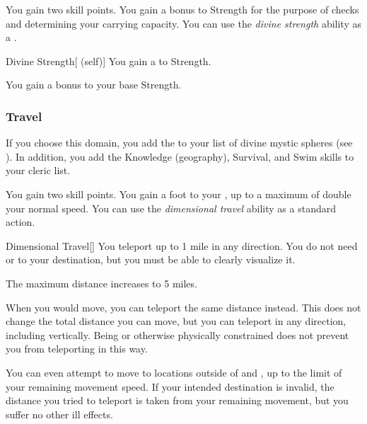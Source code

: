              You gain two skill points.
             You gain a  bonus to Strength for the purpose of checks and determining your carrying capacity.
             You can use the \textit{divine strength} ability as a .
            \begin{attuneability}{Divine Strength}[ (self)]
                You gain a   to Strength.
            \end{attuneability}
             You gain a  bonus to your base Strength.

        \subsubsection{Travel}
            If you choose this domain, you add the   to your list of divine mystic spheres (see ).
            In addition, you add the Knowledge (geography), Survival, and Swim skills to your cleric  list.

             You gain two skill points.
             You gain a  foot  to your , up to a maximum of double your normal speed.
             You can use the \textit{dimensional travel} ability as a standard action.
            \begin{freeability}{Dimensional Travel}[]
                You teleport up to 1 mile in any direction.
                You do not need  or  to your destination, but you must be able to clearly visualize it.

                \rankline
                 The maximum distance increases to 5 miles.
            \end{freeability}
             When you would move, you can teleport the same distance instead.
            This does not change the total distance you can move, but you can teleport in any direction, including vertically.
            Being  or otherwise physically constrained does not prevent you from teleporting in this way.

            You can even attempt to move to locations outside of  and , up to the limit of your remaining movement speed.
            If your intended destination is invalid, the distance you tried to teleport is taken from your remaining movement, but you suffer no other ill effects.


